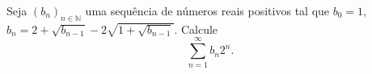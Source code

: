 Seja \((b_{n})_{n\in \mathbb{N}}\) uma sequência de números reais positivos tal que \(b_{0}=1\),
\(b_{n}=2+\sqrt{b_{n-1}}-2\sqrt{1+\sqrt{b_{n-1}}}\). Calcule
\[\sum_{n=1}^{\infty}b_{n}2^{n}.\]
